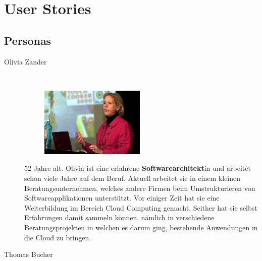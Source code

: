 \section{User Stories}
	\subsection{Personas}
		\begin{description}
			\item[Olivia Zander]\label{olivia}\ \newline
				\begin{minipage}[t]{0.35\textwidth} 
					\begin{figure}[H]
						\vspace{-0.75cm}
						\includegraphics[trim=0cm 0cm 0cm 0cm, clip=true, width=5cm]{requirements/media/img/oliviaZander.jpg}
						\caption[Symbolbild Persona Olivia Zander\newline 
						]
						{\label{Olivia Zander}}
					\end{figure}
				\end{minipage}
				\begin{minipage}[t]{0.55\textwidth}
					52 Jahre alt.
					Olivia ist eine erfahrene \textbf{Softwarearchitekt}in und arbeitet schon viele Jahre auf dem Beruf.
					Aktuell arbeitet sie in einem kleinen Beratungsunternehmen, welches andere Firmen beim Umstrukturieren von Softwareapplikationen unterstützt.
					Vor einiger Zeit hat sie eine Weiterbildung im Bereich Cloud Computing gemacht.
					Seither hat sie selbst Erfahrungen damit sammeln können, nämlich in verschiedene Beratungsprojekten in welchen es darum ging, bestehende Anwendungen in die Cloud zu bringen.
				\end{minipage}
			\item[Thomas Bucher]\label{thomas}\ \newline
				\begin{minipage}[t]{0.35\textwidth} 
					\begin{figure}[H]
						\vspace{-0.75cm}

\end{figure}
\end{minipage}
\end{description}
